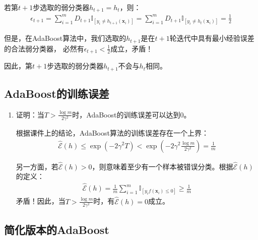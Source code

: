 \documentclass[12pt, a4paper]{article}
\newcommand{\vv}[1]{{\bm{#1}}}
\newcommand{\EE}{{\mathcal{E}}}
\newcommand{\unit}{{\mathbb{I}}}
\begin{document}
\begin{enumerate}
            若第$t + 1$步选取的弱分类器$h_{t + 1} = h_t$，则：
            \begin{align*}
            \epsilon_{t + 1} = \sum_{i = 1}^{m} D_{t + 1} \unit_{[y_i \ne h_{t + 1}(\vv{x}_i)]} = \sum_{i = 1}^{m} D_{t + 1} \unit_{[y_i \ne h_t(\vv{x}_i)]} = \frac{1}{2}
            \end{align*}

            但是，在AdaBoost算法中，我们选取的$h_{t + 1}$是在$t + 1$轮迭代中具有最小经验误差的合法弱分类器，
            必然有$\epsilon_{t + 1} < \frac{1}{2}$成立，矛盾！

            因此，第$t + 1$步选取的弱分类器$h_{t + 1}$不会与$h_t$相同。

        \end{enumerate}

    \subsection{AdaBoost的训练误差}

        \begin{enumerate}

        \item 证明：当$T > \frac{\log m}{2 \gamma^2}$时，AdaBoost的训练误差可以达到$0$。

            根据课件上的结论，AdaBoost算法的训练误差存在一个上界：
            \begin{align*}
            \hat{\EE}(h) \le \exp(-2 \gamma^2 T) < \exp(-2 \gamma^2 \frac{\log m}{2 \gamma^2}) = \frac{1}{m}
            \end{align*}

            另一方面，若$\hat{\EE}(h) > 0$，则意味着至少有一个样本被错误分类。根据$\hat{\EE}(h)$的定义：
            \begin{align*}
            \hat{\EE}(h) = \frac{1}{m} \sum_{i = 1}^{m} \unit_{[y_i f(\vv{x}_i) \le 0]} \ge \frac{1}{m}
            \end{align*}
            矛盾！因此，当$T > \frac{\log m}{2 \gamma^2}$时，有$\hat{\EE}(h) = 0$成立。

        \end{enumerate}

    \subsection{简化版本的AdaBoost}
\end{document}
